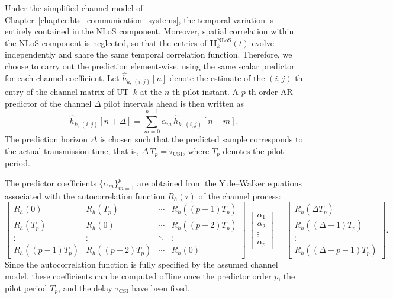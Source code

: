 Under the simplified channel model of Chapter~\ref{chapter:hts_communication_systems}, the temporal variation is entirely contained in the \ac{NLoS} component. Moreover, spatial correlation within the \ac{NLoS} component is neglected, so that the entries of $\mathbf{H}_k^{\mathrm{NLoS}}(t)$ evolve independently and share the same temporal correlation function. Therefore, we choose to carry out the prediction element-wise, using the same scalar predictor for each channel coefficient. 
Let $\hat{h}_{k, \,(i, j)}[n]$ denote the estimate of the $(i,j)$-th entry of the channel matrix of \ac{UT}~$k$ at the $n$-th pilot instant. A $p$-th order \ac{AR} predictor of the channel $\Delta$ pilot intervals ahead is then written as
\begin{equation}
\label{eq:ar_predictor}
    \hat{h}_{k, \,(i, j)}[n+\Delta] = \sum_{m=0}^{p-1} \alpha_m \, \hat{h}_{k, \,(i, j)}[n-m].
\end{equation}
The prediction horizon $\Delta$ is chosen such that the predicted sample corresponds to the actual transmission time, that is, $\Delta \, T_p = \tau_{\mathrm{CSI}}$, where $T_p$ denotes the pilot period.

The predictor coefficients $\{\alpha_m\}_{m=1}^{p}$ are obtained from the Yule--Walker equations associated with the autocorrelation function $R_h(\tau)$ of the channel process:
\begin{equation}
\label{eq:yule_walker_equations}
    \begin{bmatrix} R_h(0) & R_h(T_p) & \cdots & R_h((p-1)T_p) \\ R_h(T_p) & R_h(0) & \cdots & R_h((p-2)T_p) \\ \vdots & \vdots & \ddots & \vdots \\ R_h((p-1)T_p) & R_h((p-2)T_p) & \cdots & R_h(0) \end{bmatrix} \; \begin{bmatrix} \alpha_1 \\ \alpha_2 \\ \vdots \\ \alpha_p \end{bmatrix} = \begin{bmatrix} R_h(\Delta T_p) \\ R_h((\Delta+1)T_p) \\ \vdots \\ R_h((\Delta+p-1)T_p) \end{bmatrix}.
\end{equation}
Since the autocorrelation function is fully specified by the assumed channel model, these coefficients can be computed offline once the predictor order $p$, the pilot period $T_p$, and the delay $\tau_{\mathrm{CSI}}$ have been fixed.

